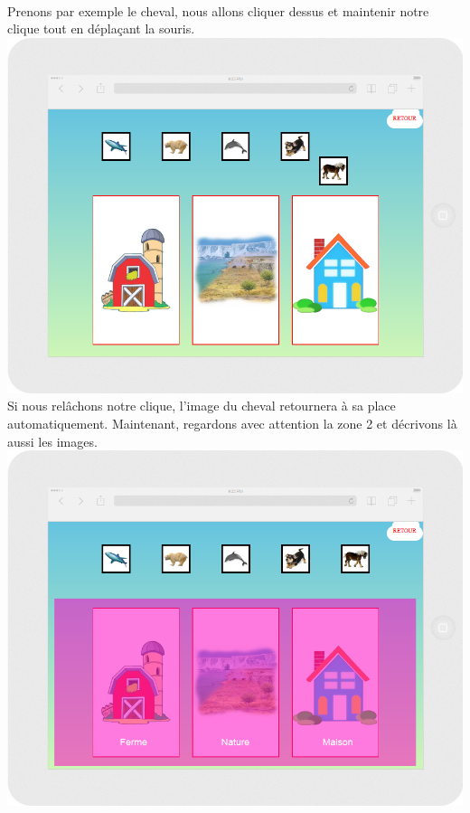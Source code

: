 \documentclass{article}
\begin{document}
\vspace{0.5cm}\\
Prenons par exemple le cheval, nous allons cliquer dessus et maintenir notre clique tout en dépla\c{c}ant la souris.
\vspace{0.5cm}\\
\includegraphics[width=1.0\textwidth]{zone2}
\vspace{0.5cm}\\
Si nous rel\^achons notre clique, l'image du cheval retournera à sa place automatiquement. Maintenant, regardons avec attention la zone 2 et décrivons là aussi les images. 
\vspace{0.5cm}\\
\includegraphics[width=1.0\textwidth]{zone3}
\end{document}
